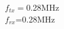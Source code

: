 \documentclass[preview]{standalone}
\begin{document}
\begin{center}
$f_{tx}=$0.28MHz\\$f_{rx}$=0.28MHz
\end{center}
\end{document}
